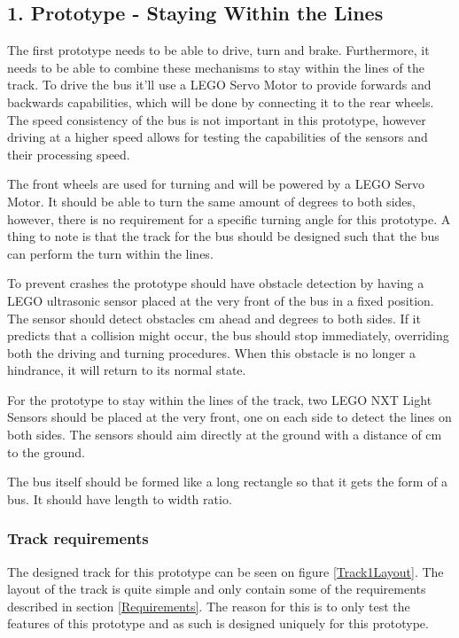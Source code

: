 \subsection{1. Prototype - Staying Within the Lines}

The first prototype needs to be able to drive, turn and brake. Furthermore, it needs to be able to combine these mechanisms to stay within the lines of the track. To drive the bus it'll use a LEGO Servo Motor to provide forwards and backwards capabilities, which will be done by connecting it to the rear wheels. The speed consistency of the bus is not important in this prototype, however driving at a higher speed allows for testing the capabilities of the sensors and their processing speed.

The front wheels are used for turning and will be powered by a LEGO Servo Motor. It should be able to turn the same amount of degrees to both sides, however, there is no requirement for a specific turning angle for this prototype. A thing to note is that the track for the bus should be designed such that the bus can perform the turn within the lines.

To prevent crashes the prototype should have obstacle detection by having a LEGO ultrasonic sensor placed at the very front of the bus in a fixed position. The sensor should detect obstacles  cm ahead and  degrees to both sides. If it predicts that a collision might occur, the bus should stop immediately, overriding both the driving and turning procedures. When this obstacle is no longer a hindrance, it will return to its normal state.  %

For the prototype to stay within the lines of the track, two LEGO NXT Light Sensors should be placed at the very front, one on each side to detect the lines on both sides. The sensors should aim directly at the ground with a distance of  cm to the ground. 

The bus itself should be formed like a long rectangle so that it gets the form of a bus. It should have  length to width ratio.

\subsubsection{Track requirements}
The designed track for this prototype can be seen on figure \ref{Track1Layout}. The layout of the track is quite simple and only contain some of the requirements described in section \ref{Requirements}. The reason for this is to only test the features of this prototype and as such is designed uniquely for this prototype.

